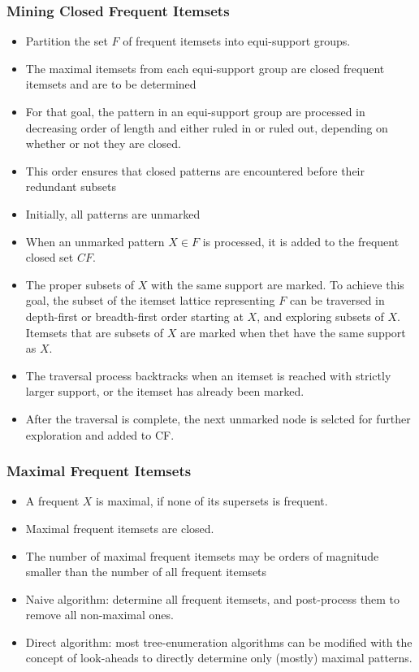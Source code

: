 \documentclass{article}
\begin{document}
\subsubsection{Mining Closed Frequent Itemsets}
\begin{itemize} 
  \item Partition the set $F$ of frequent itemsets into equi-support groups.
  \item The maximal itemsets from each equi-support group are closed frequent itemsets and are to be determined
  \item For that goal, the pattern in an equi-support group are processed in decreasing order of length and either ruled in or ruled out, depending on whether or not they are closed.
  \item This order ensures that closed patterns are encountered before their redundant subsets
  \item Initially, all patterns are unmarked
  \item When an unmarked pattern $X \in F$ is processed, it is added to the frequent closed set $CF$.
  \item The proper subsets of $X$ with the same support are marked. To achieve this goal, the subset of the itemset lattice representing $F$ can be traversed in depth-first or breadth-first order starting at $X$, and exploring subsets of $X$. Itemsets that are subsets of $X$ are marked when thet have the same support as $X$.
  \item The traversal process backtracks when an itemset is reached with strictly larger support, or the itemset has already been marked.
  \item After the traversal is complete, the next unmarked node is selcted for further exploration and added to CF.
\end{itemize}

\subsubsection{Maximal Frequent Itemsets}
\begin{itemize} 
  \item A frequent $X$ is maximal, if none of its supersets is frequent.
  \item Maximal frequent itemsets are closed.
  \item The number of maximal frequent itemsets may be orders of magnitude smaller than the number of all frequent itemsets
  \item Naive algorithm: determine all frequent itemsets, and post-process them to remove all non-maximal ones.
  \item Direct algorithm: most tree-enumeration algorithms can be modified with the concept of look-aheads to directly determine only (mostly) maximal patterns.
\end{itemize}
\end{document}
